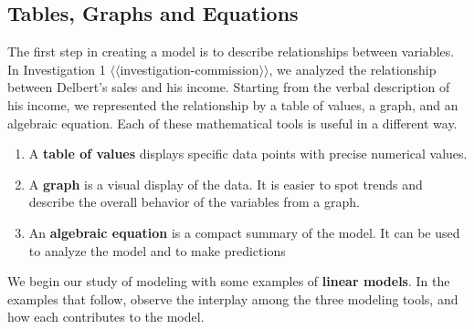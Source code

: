 \documentclass[10pt,]{book}
\newcommand{\terminology}[1]{\textbf{#1}}
\theoremstyle{plain}
\theoremstyle{definition}
\theoremstyle{definition}
\theoremstyle{definition}
\theoremstyle{definition}
\numberwithin{equation}{section}
\begin{document}
\subsection[Tables, Graphs and Equations]{Tables, Graphs and Equations}\label{subsection-1}
The first step in creating a model is to describe relationships between variables.  In Investigation 1 {$\langle\langle$investigation-commission$\rangle\rangle$}, we analyzed the relationship between Delbert's sales and his income.  Starting from the verbal description of his income, we represented the relationship by a table of values, a graph, and an algebraic equation.  Each of these mathematical tools is useful in a different way.%
\leavevmode%
\begin{enumerate}
\item\hypertarget{li-10}{}A \terminology{table of values} displays specific data points with precise numerical values.%
\item\hypertarget{li-11}{}A \terminology{graph} is a visual display of the data.  It is easier to spot trends and describe the overall behavior of the variables from a graph.%
\item\hypertarget{li-12}{}An \terminology{algebraic equation} is a compact summary of the model.  It can be used to analyze the model and to make predictions%
\end{enumerate}
\par
We begin our study of modeling with some examples of \terminology{linear models}.  In the examples that follow, observe the interplay among the three modeling tools, and how each contributes to the model.%
\end{document}
